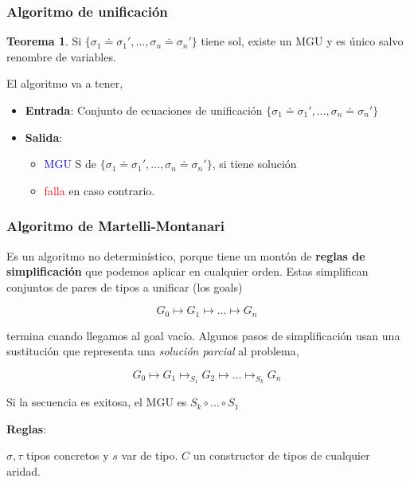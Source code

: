 \documentclass{report}
\theoremstyle{definition} %
\newtheorem{theorem}{Teorema}[chapter]
\newcommand{\changed}[1]{\textcolor{Red}{#1}}
\newcommand{\select}[1]{\textcolor{Blue}{#1}}
\newcommand{\comp}[2]{#1 \circ #2}
\newcommand{\unify}[2]{#1 \doteq #2}
\newcommand{\unifySetD}{\{
    \unify{\sigma_1}{\sigma_1'},
    \dots,
    \unify{\sigma_n}{\sigma_n'} 
\}}
\newcommand{\simpSust}[1]{\mapsto_{#1}}
\newcommand{\simp}{\mapsto}
\begin{document}
\subsubsection{Algoritmo de unificación}

\begin{theorem}
    Si $\unifySetD$ tiene sol, existe un MGU y es único salvo renombre de variables.
\end{theorem}
 
El algoritmo va a tener,

\begin{itemize}
    \item \textbf{Entrada}: Conjunto de ecuaciones de unificación $\unifySetD$
    \item \textbf{Salida}:
    \begin{itemize}
        \item \select{MGU} S de $\unifySetD$, si tiene solución
        \item \changed{falla} en caso contrario.
    \end{itemize}
\end{itemize}

\subsubsection{Algoritmo de Martelli-Montanari}

Es un algoritmo no determinístico, porque tiene un montón de \textbf{reglas de
simplificación} que podemos aplicar en cualquier orden. Estas simplifican
conjuntos de pares de tipos a unificar (los goals)

\[G_0 \simp G_1 \simp \dots \simp G_n \]

termina cuando llegamos al goal vacío. Algunos pasos de simplificación usan una
sustitución que representa una \textit{solución parcial} al problema,

\[
    G_0 \simp G_1
    \simpSust{S_1} G_2
    \simp \dots
    \simpSust{S_k} G_n
\]

Si la secuencia es exitosa, el MGU es $\comp{S_k}{\comp{\dots}{S_1}}$

\textbf{Reglas}:

\newcommand{\typeConstr}{C}
\newcommand{\typeConstrTwo}{C'}

$\sigma, \tau$ tipos concretos y $s$ var de tipo. $C$ un constructor de tipos de
cualquier aridad.
\end{document}
